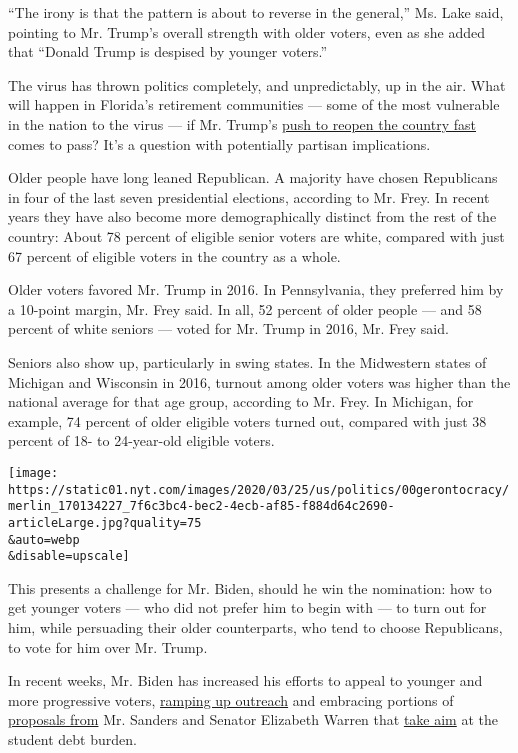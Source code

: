 ``The irony is that the pattern is about to reverse in the general,''
Ms. Lake said, pointing to Mr. Trump's overall strength with older
voters, even as she added that ``Donald Trump is despised by younger
voters.''

The virus has thrown politics completely, and unpredictably, up in the
air. What will happen in Florida's retirement communities --- some of
the most vulnerable in the nation to the virus --- if Mr. Trump's
\href{https://www.nytimes.com/2020/03/23/business/trump-coronavirus-economy.html}{push
to reopen the country fast} comes to pass? It's a question with
potentially partisan implications.

Older people have long leaned Republican. A majority have chosen
Republicans in four of the last seven presidential elections, according
to Mr. Frey. In recent years they have also become more demographically
distinct from the rest of the country: About 78 percent of eligible
senior voters are white, compared with just 67 percent of eligible
voters in the country as a whole.

Older voters favored Mr. Trump in 2016. In Pennsylvania, they preferred
him by a 10-point margin, Mr. Frey said. In all, 52 percent of older
people --- and 58 percent of white seniors --- voted for Mr. Trump in
2016, Mr. Frey said.

Seniors also show up, particularly in swing states. In the Midwestern
states of Michigan and Wisconsin in 2016, turnout among older voters was
higher than the national average for that age group, according to Mr.
Frey. In Michigan, for example, 74 percent of older eligible voters
turned out, compared with just 38 percent of 18- to 24-year-old eligible
voters.

\texttt{[image: https://static01.nyt.com/images/2020/03/25/us/politics/00gerontocracy/merlin\_170134227\_7f6c3bc4-bec2-4ecb-af85-f884d64c2690-articleLarge.jpg?quality=75\\\&auto=webp\\\&disable=upscale]}

This presents a challenge for Mr. Biden, should he win the nomination:
how to get younger voters --- who did not prefer him to begin with ---
to turn out for him, while persuading their older counterparts, who tend
to choose Republicans, to vote for him over Mr. Trump.

In recent weeks, Mr. Biden has increased his efforts to appeal to
younger and more progressive voters,
\href{https://www.nytimes.com/2020/03/17/us/politics/joe-biden-democrats-liberals.html}{ramping
up outreach} and embracing portions of
\href{https://www.nytimes.com/2020/03/15/us/politics/biden-backs-free-college.html}{proposals
from} Mr. Sanders and Senator Elizabeth Warren that
\href{https://www.nytimes.com/2020/03/14/us/politics/biden-warren-bankruptcy.html}{take
aim} at the student debt burden.

